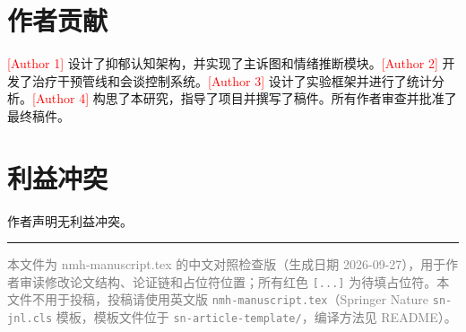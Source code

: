 \documentclass[11pt,a4paper]{article}
\newcommand{\ph}[1]{\textcolor{red}{[#1]}}
\begin{document}
\section*{作者贡献}

\ph{Author 1} 设计了抑郁认知架构，并实现了主诉图和情绪推断模块。\ph{Author 2} 开发了治疗干预管线和会谈控制系统。\ph{Author 3} 设计了实验框架并进行了统计分析。\ph{Author 4} 构思了本研究，指导了项目并撰写了稿件。所有作者审查并批准了最终稿件。

\section*{利益冲突}

作者声明无利益冲突。

\renewcommand{\refname}{参考文献}



\vspace{1em}
\hrule
\vspace{0.5em}
\noindent\small\textcolor{gray}{本文件为 nmh-manuscript.tex 的中文对照检查版（生成日期 2026-09-27），用于作者审读修改论文结构、论证链和占位符位置；所有红色 \texttt{[...]} 为待填占位符。本文件不用于投稿，投稿请使用英文版 \texttt{nmh-manuscript.tex}（Springer Nature \texttt{sn-jnl.cls} 模板，模板文件位于 \texttt{sn-article-template/}，编译方法见 README）。}
\end{document}
